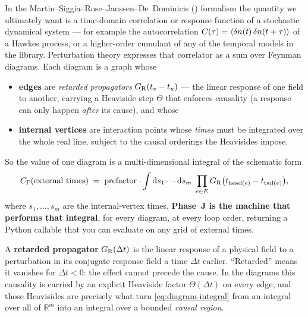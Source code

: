 In the Martin--Siggia--Rose--Janssen--De~Dominicis (\msrjd) formalism the
quantity we ultimately want is a time-domain correlation or response function of
a stochastic dynamical system --- for example the autocorrelation
$C(\tau) = \left\langle \delta n(t)\,\delta n(t+\tau) \right\rangle$ of a Hawkes process, or a
higher-order cumulant of any of the temporal models in the library. Perturbation
theory expresses that correlator as a sum over Feynman diagrams. Each diagram is
a graph whose

\begin{itemize}
  \item \textbf{edges} are \emph{retarded propagators} $G_{\mathrm R}(t_v - t_u)$ --- the
        linear response of one field to another, carrying a Heaviside step
        $\Theta$ that enforces causality (a response can only happen \emph{after}
        its cause), and whose
  \item \textbf{internal vertices} are interaction points whose \emph{times}
        must be integrated over the whole real line, subject to the causal
        orderings the Heavisides impose.
\end{itemize}

So the value of one diagram is a multi-dimensional integral of the schematic
form
\begin{equation}
  C_\Gamma(\text{external times})
   \;=\; \text{prefactor} \cdot
   \int \mathrm{d} s_1 \cdots \mathrm{d} s_m \;\prod_{e \in E} G_{\mathrm R}\big(t_{\text{head}(e)} - t_{\text{tail}(e)}\big),
  \label{eq:diagram-integral}
\end{equation}
where $s_1, \dots, s_m$ are the internal-vertex times. \textbf{Phase~J is the
machine that performs that integral}, for every diagram, at every loop order,
returning a Python callable  that you can
evaluate on any grid of external times.

\begin{defn}
A \textbf{retarded propagator} $G_{\mathrm R}(\Delta t)$ is the linear response of a
physical field to a perturbation in its conjugate response field a time
$\Delta t$ earlier. ``Retarded'' means it vanishes for $\Delta t < 0$: the
effect cannot precede the cause. In the diagrams this causality is carried by an
explicit Heaviside factor $\Theta(\Delta t)$ on every edge, and those Heavisides
are precisely what turn \eqref{eq:diagram-integral} from an integral over all of
$\mathbb{R}^m$ into an integral over a bounded \emph{causal region}.
\end{defn}

